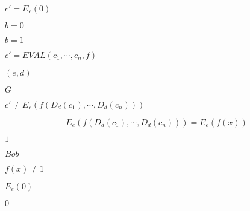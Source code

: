 \documentclass[10pt]{book}
\begin{document}
\begin{mdSnippets}
\begin{mdInlineSnippet}%
$c' = E_e(0)$\end{mdInlineSnippet}%
\begin{mdInlineSnippet}[2cd846c62474f70be3291ce24c1bcf6a]%
$b = 0$\end{mdInlineSnippet}%
\begin{mdInlineSnippet}[d8a35c47c0f29d1f868a2769cd3003c5]%
$b = 1$\end{mdInlineSnippet}%
\begin{mdInlineSnippet}[1d73579c0c45d8a16058524663e3468f]%
$c' = EVAL(c_1, \cdots, c_n, f)$\end{mdInlineSnippet}%
\begin{mdInlineSnippet}%
$(e,d)$\end{mdInlineSnippet}%
\begin{mdInlineSnippet}[dfcf28d0734569a6a693bc8194de62bf]%
$G$\end{mdInlineSnippet}%
\begin{mdInlineSnippet}[4d20e65828de8debdeed877916317463]%
$c' \neq E_e(f(D_d(c_1),\cdots,D_d(c_n)))$\end{mdInlineSnippet}%
\begin{mdDisplaySnippet}%
\[%
E_e(f(D_d(c_1),\cdots,D_d(c_n))) = E_e(f(x))
\]%
\end{mdDisplaySnippet}%
\begin{mdInlineSnippet}[c4ca4238a0b923820dcc509a6f75849b]%
$1$\end{mdInlineSnippet}%
\begin{mdInlineSnippet}%
$Bob$\end{mdInlineSnippet}%
\begin{mdInlineSnippet}%
$f(x) \neq 1$\end{mdInlineSnippet}%
\begin{mdInlineSnippet}[23533071b87b6afd08c96399de68349f]%
$E_e(0)$\end{mdInlineSnippet}%
\begin{mdInlineSnippet}%
$0$\end{mdInlineSnippet}%

\end{mdSnippets}
\end{document}
